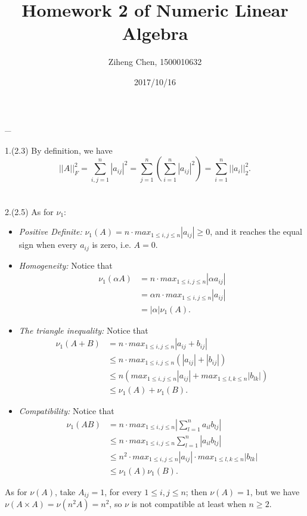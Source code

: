 \documentclass[11pt]{article}
\begin{document}
\title{Homework 2 of Numeric Linear Algebra}
\date{2017/10/16}
\author{Ziheng Chen, 1500010632}
\maketitle
\_
\\\\
1.(2.3) By definition, we have
$$||A||^2_F = \sum_{i,j=1}^{n} |a_{ij}|^2 = \sum_{j=1}^{n} \left(\sum_{i=1}^{n} |a_{ij}|^2\right) = \sum_{i=1}^n ||a_i||^2_2.$$
\\\\
2.(2.5) As for $\nu_1$:
\begin{itemize}
	\item \emph{Positive Definite:} $\nu_1(A) = n \cdot max_{1 \le i,j \le n} |a_{ij}| \ge 0$, and it reaches the equal sign when every $a_{ij}$ is zero, i.e. $A=0$.
	\item \emph{Homogeneity:} Notice that 
	\begin{align*}
	\nu_1(\alpha A) &= n \cdot max_{1 \le i,j \le n} |\alpha a_{ij}| \\
					&= \alpha n \cdot max_{1 \le i,j \le n} |a_{ij}| \\
					&= |\alpha| \nu_1(A).
	\end{align*}
	\item \emph{The triangle inequality:} Notice that 
	\begin{align*}
	\nu_1(A+B) &= n \cdot max_{1 \le i,j \le n} |a_{ij}+b_{ij}| \\
	&\le n \cdot max_{1 \le i,j \le n} (|a_{ij}|+|b_{ij}|) \\
	&\le n \left( max_{1 \le i,j \le n} |a_{ij}| + max_{1 \le l,k \le n} |b_{lk}| \right)\\
	&\le \nu_1(A) + \nu_1(B).
	\end{align*}
	\item \emph{Compatibility:} Notice that 
	\begin{align*}
	\nu_1(AB) &= n \cdot max_{1 \le i,j \le n} |\sum_{l=1}^n a_{il}b_{lj}| \\
				&\le n \cdot max_{1 \le i,j \le n} \sum_{l=1}^n |a_{il}b_{lj}| \\
				&\le n^2 \cdot max_{1 \le i,j \le n} |a_{ij}| \cdot max_{1 \le l,k \le n} |b_{lk}| \\
				&\le \nu_1(A) \nu_1(B).
	\end{align*}
\end{itemize}
As for $\nu(A)$, take $A_{ij}=1$, for every $1 \le i,j \le n$; then $\nu(A)=1$, but we have $\nu(A\times A)=\nu(n^2 A)=n^2$, so $\nu$ is not compatible at least when $n \ge 2$.
\end{document}
